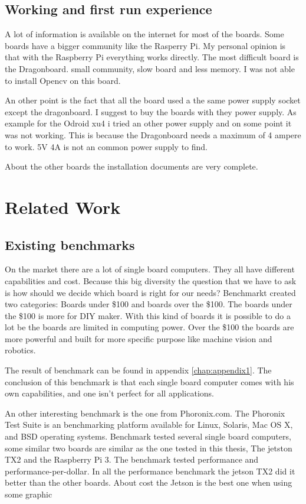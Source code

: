 \documentclass[english]{book_template} %
\begin{document}
\section{Working and first run experience}

A lot of information is available on the internet for most of the boards. Some boards have a bigger community like the Rasperry Pi.
My personal opinion is that with the Raspberry Pi everything works directly. The most difficult board is the Dragonboard. small community, slow board and less memory. I was not able to install Opencv on this board.

An other point is the fact that all the board used a the same power supply socket except the dragonboard. I suggest to buy the boards with they power supply. As example for the Odroid xu4 i tried an other power supply and on some point it was not working. This is because the Dragonboard needs a maximum of 4 ampere to work. 5V 4A is not an common power supply to find.

About the other boards the installation documents are very complete. 

\chapter{Related Work}

\section{Existing benchmarks} \label{SBC}

On the market there are a lot of single board computers. They all have different capabilities and cost.\cite{Benchmar1:online} Because this big diversity the question that we have to ask is how should we decide which board is right for our needs?
Benchmarkt \cite{Benchmar1:online} created two categories: Boards under \$100 and boards over the \$100. The boards under the \$100 is more for DIY maker. With this kind of boards it is possible to do a lot be the boards are limited in computing power. Over the \$100 the boards are more powerful and built for more specific purpose like machine vision and robotics.\cite{Benchmar1:online}

The result of benchmark \cite{Benchmar1:online} can be found in  appendix \ref{chap:appendix1}. The conclusion of this benchmark is that each single board computer comes with his own capabilities, and one isn't perfect for all applications.

An other interesting benchmark is the one from Phoronix.com. The Phoronix Test Suite is an benchmarking platform available for
Linux, Solaris, Mac OS X, and BSD operating systems.  \cite{Phoronix88:online} Benchmark \cite{Benchmar96:online} tested several single board computers, some similar two boards are similar as the one tested in this thesis, The jetston TX2 and the Raspberry  Pi 3. 
The benchmark tested performance and performance-per-dollar. In all the performance benchmark the jetson TX2 did it better than the other boards. About cost the Jetson is the best one when using some graphic \cite{Benchmar96:online}
\end{document}
